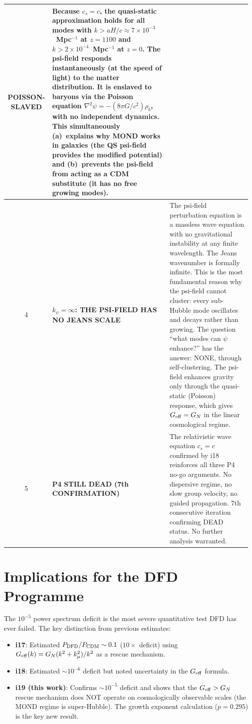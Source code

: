 \documentclass[aps,prd,twocolumn,nofootinbib]{revtex4-2}
\newcommand{\ee}[1]{\times 10^{#1}}
\newcommand{\Geff}{G_{\rm eff}}
\newcommand{\kmu}{k_\mu}
\newcommand{\kpsi}{k_\psi}
\begin{document}
\begin{table}[t]
\begin{tabular}{@{}clp{11cm}@{}}
{  POISSON-SLAVED} &
  Because $c_s = c$, the quasi-static approximation holds for all
  modes with $k > aH/c \approx 7\ee{-3}$~Mpc$^{-1}$ at $z = 1100$
  and $k > 2\ee{-4}$~Mpc$^{-1}$ at $z = 0$. The psi-field responds
  instantaneously (at the speed of light) to the matter distribution.
  It is enslaved to baryons via the Poisson equation $\nabla^2\psi
  = -(8\pi G/c^2)\rho_b$, with no independent dynamics. This
  simultaneously (a)~explains why MOND works in galaxies (the QS
  psi-field provides the modified potential) and (b)~prevents the
  psi-field from acting as a CDM substitute (it has no free growing
  modes). \\
\midrule
4 & \textbf{$\kpsi = \infty$: THE PSI-FIELD HAS NO JEANS SCALE} &
  The psi-field perturbation equation is a massless wave equation with
  no gravitational instability at any finite wavelength. The Jeans
  wavenumber is formally infinite. This is the most fundamental
  reason why the psi-field cannot cluster: every sub-Hubble mode
  oscillates and decays rather than growing. The question ``what
  modes can $\psi$ enhance?'' has the answer: NONE, through
  self-clustering. The psi-field enhances gravity only through the
  quasi-static (Poisson) response, which gives $\Geff = G_N$ in
  the linear cosmological regime. \\
\midrule
5 & \textbf{P4 STILL DEAD (7th CONFIRMATION)} &
  The relativistic wave equation $c_s = c$ confirmed by i18 reinforces
  all three P4 no-go arguments. No dispersive regime, no slow group
  velocity, no guided propagation. 7th consecutive iteration confirming
  DEAD status. No further analysis warranted. \\
\bottomrule
\end{tabular}
\end{table}


\section*{Implications for the DFD Programme}

The $10^{-5}$ power spectrum deficit is the most severe quantitative
test DFD has ever failed. The key distinction from previous estimates:

\begin{itemize}
\item \textbf{i17}: Estimated $P_{\rm DFD}/P_{\rm CDM} \sim 0.1$
  ($10\times$ deficit) using $\Geff(k) = G_N(k^2 + \kmu^2)/k^2$ as
  a rescue mechanism.

\item \textbf{i18}: Estimated $\sim 10^{-6}$ deficit but noted
  uncertainty in the $\Geff$ formula.

\item \textbf{i19 (this work)}: Confirms $\sim 10^{-5}$ deficit and
  shows that the $\Geff > G_N$ rescue mechanism does NOT operate on
  cosmologically observable scales (the MOND regime is super-Hubble).
  The growth exponent calculation ($p = 0.295$) is the key new result.
\end{itemize}
\end{document}
